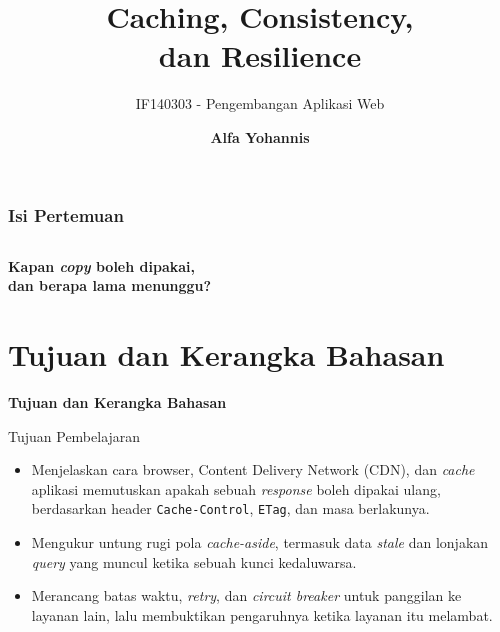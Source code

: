 \documentclass[aspectratio=169, table, 12pt]{beamer}
\title{\Huge Caching, Consistency,\\ \vspace{10pt} dan Resilience}
\subtitle{IF140303 - Pengembangan Aplikasi Web}
\author{\textbf{Alfa Yohannis}}
\begin{document}
\frame{\titlepage}

\begin{frame}[fragile]
  \frametitle{Isi Pertemuan}
  \vspace{20pt}
  \begin{columns}[t]
    \tableofcontents[sections={1-4}]

    \tableofcontents[sections={5-7}]
  \end{columns}
\end{frame}

\begin{frame}{\hfill}
  \centering
  \Huge{\textbf{Kapan \textit{copy} boleh dipakai,\\dan berapa lama menunggu?}}
\end{frame}

\section{Tujuan dan Kerangka Bahasan}

\begin{frame}{\hfill}
  \centering
  \Huge{\textbf{Tujuan dan Kerangka Bahasan}}
\end{frame}

\begin{frame}{{\Large Tujuan Pembelajaran}}
  \vspace{12pt}
  \begin{itemize}
    \item Menjelaskan cara browser, Content Delivery Network (CDN), dan
          \textit{cache} aplikasi memutuskan apakah sebuah \textit{response} boleh
          dipakai ulang, berdasarkan header \texttt{Cache-Control},
          \texttt{ETag}, dan masa berlakunya.
    \item Mengukur untung rugi pola \textit{cache-aside}, termasuk data \textit{stale}
          dan lonjakan \textit{query} yang muncul ketika sebuah kunci kedaluwarsa.
    \item Merancang batas waktu, \textit{retry}, dan \textit{circuit breaker}
          untuk panggilan ke layanan lain, lalu membuktikan pengaruhnya ketika
          layanan itu melambat.
  \end{itemize}
\end{frame}
\end{document}
